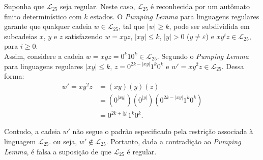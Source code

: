 \documentclass[12pt]{article}
\def\myling{{25}} %
\begin{document}
%
\begin{tcolorbox}[rounded corners, colback=yellow!5, colframe=red!40!black]
Suponha que $\mathcal{L}_{\myling}$ seja regular. Neste caso, $\mathcal{L}_{\myling}$ é reconhecida por um autômato finito determinístico com $k$ estados. O \emph{Pumping Lemma} para linguagens regulares garante que qualquer cadeia $w\in \mathcal{L}_{\myling}$, tal que $|w|\geqslant k$, pode ser subdividida em subcadeias $x$, $y$ e $z$ satisfazendo $w=xyz$, $|xy|\leqslant k$, $|y|>0$ ($y\neq\varepsilon$) e $xy^iz\in \mathcal{L}_{\myling}$, para $i\geqslant 0$.\\

Assim, considere a cadeia $w=xyz=0^k10^k\in \mathcal{L}_{\myling}$. Segundo o \emph{Pumping Lemma} para linguagens regulares $|xy|\leqslant k$, $z=0^{2k-|xy|}1^k0^k$ e $w'= xy^2z\in \mathcal{L}_{\myling}$. Dessa forma:
\begin{align*}
 w' = xy^2z &= (xy)(y)(z)\\
            &= (0^{|xy|})(0^{|y|})(0^{2k-|xy|}1^k0^k)\\
            &= 0^{2k+|y|}1^k0^k.
\end{align*}

Contudo, a cadeia $w'$ não segue o padrão especificado pela restrição associada à linguagem $\mathcal{L}_{\myling}$. ou seja, $w'\notin\mathcal{L}_{\myling}$. Portanto, dada a contradição ao \emph{Pumping Lemma}, é falsa a suposição de que $\mathcal{L}_{\myling}$ é regular.
\end{tcolorbox}
%
\end{document}
